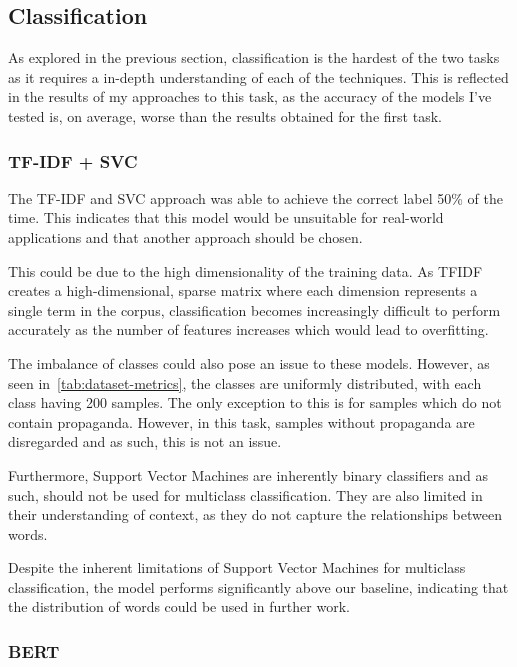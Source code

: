 \documentclass[twocolumn]{article}
\begin{document}
\subsection{Classification}    

As explored in the previous section, classification is the hardest of the two tasks as it requires a in-depth understanding of each of the techniques. This is reflected in the results of my approaches to this task, as the accuracy of the models I've tested is, on average, worse than the results obtained for the first task. 

\subsubsection{TF-IDF + SVC}

The TF-IDF and SVC approach was able to achieve the correct label 50\% of the time. This indicates that this model would be unsuitable for real-world applications and that another approach should be chosen. 

This could be due to the high dimensionality of the training data. As TFIDF creates a high-dimensional, sparse matrix where each dimension represents a single term in the corpus, classification becomes increasingly difficult to perform accurately as the number of features increases which would lead to overfitting. 

The imbalance of classes could also pose an issue to these models. However, as seen in~\autoref{tab:dataset-metrics}, the classes are uniformly distributed, with each class having 200 samples. The only exception to this is for samples which do not contain propaganda. However, in this task, samples without propaganda are disregarded and as such, this is not an issue. 

Furthermore, Support Vector Machines are inherently binary classifiers and as such, should not be used for multiclass classification. They are also limited in their understanding of context, as they do not capture the relationships between words. 

Despite the inherent limitations of Support Vector Machines for multiclass classification, the model performs significantly above our baseline, indicating that the distribution of words could be used in further work. 

\subsubsection{BERT}
\end{document}

